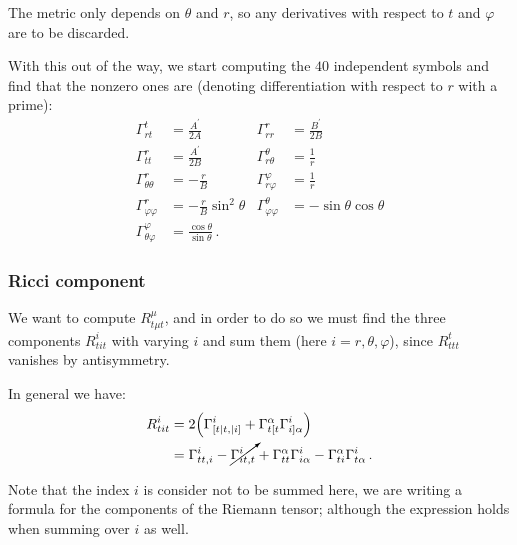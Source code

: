 \documentclass[main.tex]{subfiles}
\begin{document}
The metric only depends on \(\theta \) and \(r\), so any derivatives with respect to \(t\) and \(\varphi \) are to be discarded. 

With this out of the way, we start computing the \(40\) independent symbols and find that the nonzero ones are (denoting differentiation with respect to \(r\) with a prime): 
%
\begin{subequations} \label{eq:schwarzschild-christoffel}
\begin{align}
  \Gamma^{t}_{rt} &= \frac{A^{\prime }}{2A}  &
  \Gamma^{r}_{rr} &= \frac{B^{\prime }}{2B}  \\
  \Gamma^{r}_{tt} &= \frac{A^{\prime }}{2B}  &
  \Gamma^{\theta }_{r \theta } &= \frac{1}{r}  \\
  \Gamma^{r}_{\theta \theta } &= -\frac{r}{B}  &
  \Gamma^{\varphi }_{r \varphi } &= \frac{1}{r}  \\
  \Gamma^{r}_{\varphi \varphi } &= - \frac{r}{B} \sin^2 \theta  &
  \Gamma^{\theta }_{\varphi \varphi } &= - \sin \theta \cos \theta  \\
  \Gamma^{\varphi }_{\theta \varphi } &= \frac{\cos \theta }{\sin \theta }
\,.
\end{align}
\end{subequations}

\subsubsection{Ricci component}

We want to compute \(R^{\mu }_{t \mu t }\), and in order to do so we must find the three components \(R^{i}_{tit}\) with varying \(i\) and sum them (here \(i = r, \theta,\varphi \)), since \(R^{t}_{ttt}\) vanishes by antisymmetry. 

In general we have: 
%
\begin{subequations}
\begin{align}
  R^{i}_{tit} &= 2 \qty( \Gamma^{i}_{[t| t, |i]}  + \Gamma^{\alpha }_{t[t} \Gamma^{i}_{i] \alpha })  \\
  &= \Gamma^{i}_{tt, i} - \cancelto{}{\Gamma^{i}_{it,t}}
  + \Gamma^{\alpha }_{tt} \Gamma^{i}_{i\alpha }
  - \Gamma^{\alpha }_{ti} \Gamma^{i}_{t\alpha }
\,.
\end{align}
\end{subequations}

Note that the index \(i\) is consider not to be summed here, we are writing a formula for the components of the Riemann tensor; although the expression holds when summing over \(i\) as well. 
\end{document}
